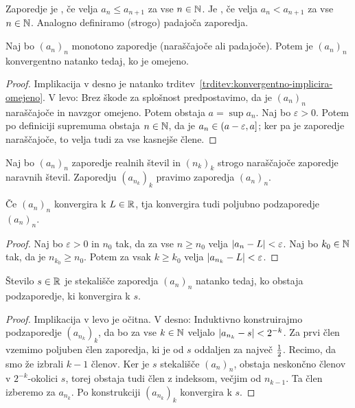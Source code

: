 \begin{definicija}
  Zaporedje je , če velja $a_n \le a_{n+1}$ za vse $n \in
  \mathbb{N}$.
  Je , če velja $a_n < a_{n+1}$ za vse $n \in \mathbb{N}$.
  Analogno definiramo (strogo) padajoča zaporedja.
\end{definicija}

\begin{izrek}
  Naj bo $(a_n)_n$ monotono zaporedje (naraščajoče ali padajoče).
  Potem je $(a_n)_n$ konvergentno natanko tedaj, ko je omejeno.
\end{izrek}

\begin{proof}
  Implikacija v desno je natanko
  trditev~\ref{trditev:konvergentno-implicira-omejeno}.
  V levo:
  Brez škode za splošnost predpostavimo, da je $(a_n)_n$ naraščajoče in navzgor
  omejeno.
  Potem obstaja $a = \sup a_n$.
  Naj bo $\varepsilon > 0$.
  Potem po definiciji supremuma obstaja $n \in \mathbb{N}$, da je $a_n \in \left(a -
	\varepsilon, a\right]$; ker pa je zaporedje naraščajoče, to velja tudi za vse
  kasnejše člene.
\end{proof}

\begin{definicija}
  Naj bo $(a_n)_n$ zaporedje realnih števil in $(n_k)_k$ strogo naraščajoče
  zaporedje naravnih števil.
  Zaporedju $(a_{n_k})_k$ pravimo  zaporedja $(a_n)_n$.
\end{definicija}

\begin{trditev}
  Če $(a_n)_n$ konvergira k $L \in \mathbb{R}$, tja konvergira tudi poljubno
  podzaporedje $(a_n)_n$.
\end{trditev}

\begin{proof}
  Naj bo $\varepsilon > 0$ in $n_0$ tak, da za vse $n \ge n_0$ velja $\left| a_n -
	L \right| < \varepsilon$.
  Naj bo $k_0 \in \mathbb{N}$ tak, da je $n_{k_0} \ge n_0$.
  Potem za vsak $k \ge k_0$ velja $\left| a_{n_k} - L \right| < \varepsilon$.
\end{proof}

\begin{izrek}
  Število $s \in \mathbb{R}$ je stekališče zaporedja $(a_n)_n$ natanko tedaj, ko obstaja
  podzaporedje, ki konvergira k $s$.
\end{izrek}

\begin{proof}
  Implikacija v levo je očitna.
  V desno:
  Induktivno konstruirajmo podzaporedje $(a_{n_k})_k$, da bo za vse $k \in \mathbb{N}$
  veljalo $\left| a_{n_k} - s \right| < 2^{-k}$.
  Za prvi člen vzemimo poljuben člen zaporedja, ki je od $s$ oddaljen za največ
  $\frac{1}{2}$.
  Recimo, da smo že izbrali $k-1$ členov.
  Ker je $s$ stekališče $(a_n)_n$, obstaja neskončno členov v $2^{-k}$-okolici
  $s$, torej obstaja tudi člen z indeksom, večjim od $n_{k-1}$.
  Ta člen izberemo za $a_{n_k}$.
  Po konstrukciji $(a_{n_k})_k$ konvergira k $s$.
\end{proof}

